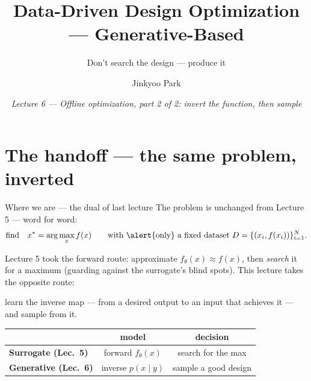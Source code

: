 \documentclass[10pt, aspectratio=169]{beamer}
\title{Data-Driven Design Optimization --- Generative-Based}
\subtitle{Don't search the design --- produce it}
\author{Jinkyoo Park}
\institute{KAIST}
\date{\textit{Lecture 6 --- Offline optimization, part 2 of 2: invert the function, then sample}}
\begin{document}
\maketitle

\section{The handoff --- the same problem, inverted}

\begin{frame}{Where we are --- the dual of last lecture}
\vspace{2pt}
The problem is unchanged from Lecture 5 --- word for word:
\[
\text{find}\quad x^* = \arg\max_x f(x) \qquad \text{with \alert{only} a fixed dataset } D = \{(x_i, f(x_i))\}_{i=1}^N.
\]
\medskip

\pause
Lecture 5 took the \alert{forward} route: approximate $f_\theta(x)\approx f(x)$, then \emph{search} it for a maximum (guarding against the surrogate's blind spots). This lecture takes the opposite route:
\medskip
\begin{center}\large
learn the \alert{inverse} map --- from a desired output to an input that achieves it --- and \alert{sample} from it.
\end{center}
\medskip

\pause
\begin{center}\footnotesize\renewcommand{\arraystretch}{1.45}
\begin{tabular}{l|c|c}
 & \textbf{model} & \textbf{decision} \\
\hline
\textbf{Surrogate (Lec.\ 5)} & forward $f_\theta(x)$ & \alert{search} for the max \\
\textbf{Generative (Lec.\ 6)} & \cellcolor{mDarkTeal!15}inverse $p(x\mid y)$ & \cellcolor{mDarkTeal!15}\alert{sample} a good design \\
\end{tabular}
\end{center}
\end{frame}
\end{document}
